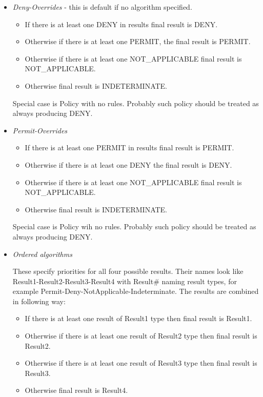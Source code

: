 \documentclass{book}
\begin{document}
\begin{itemize}
    \item  \emph{Deny-Overrides} - this is default if no algorithm specified.

    \begin{itemize}
        \item If there is at least one DENY in results final result is DENY.
        \item Otherwise if there is at least one PERMIT, the final result is PERMIT.
        \item Otherwise if there is at least one NOT\_APPLICABLE final result is NOT\_APPLICABLE.
        \item Otherwise final result is INDETERMINATE.
    \end{itemize}

    Special case is Policy with no rules. Probably such policy should be treated as always producing DENY.

    \item  \emph{Permit-Overrides}

    \begin{itemize}
        \item If there is at least one PERMIT in results final result is PERMIT.
        \item Otherwise if there is at least one DENY the final result is DENY.
        \item Otherwise if there is at least one NOT\_APPLICABLE final result is NOT\_APPLICABLE.
        \item Otherwise final result is INDETERMINATE.
    \end{itemize}

    Special case is Policy wih no rules. Probably such policy should be treated as always producing DENY.

    \item  \emph{Ordered algorithms}

These specify priorities for all four possible results. Their names look like Result1-Result2-Result3-Result4 with Result\# naming result types, for example Permit-Deny-NotApplicable-Indeterminate. The results are combined in following way:

    \begin{itemize}
        \item If there is at least one result of Result1 type then final result is Result1.
        \item Otherwise if there is at least one result of Result2 type then final result is Result2.
        \item Otherwise if there is at least one result of Result3 type then final result is Result3.
        \item Otherwise final result is Result4.
    \end{itemize}


\end{itemize}
\end{document}
